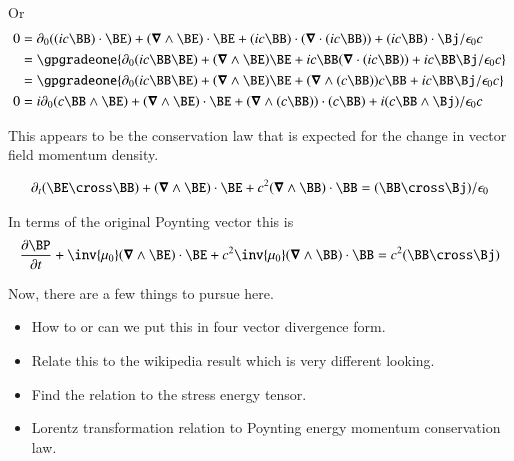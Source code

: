 Or
\begin{align*}
0
&= \partial_0 {((ic \BB) \cdot \BE)} +(\spacegrad \wedge \BE) \cdot \BE + (i c\BB) \cdot (\spacegrad \cdot (ic \BB)) + (i c\BB) \cdot \Bj/\epsilon_0 c \\
&= \gpgradeone{ \partial_0 (ic \BB \BE) +(\spacegrad \wedge \BE) \BE + i c\BB (\spacegrad \cdot (ic \BB)) + i c\BB \Bj/\epsilon_0 c } \\
&= \gpgradeone{ \partial_0 (ic \BB \BE) +(\spacegrad \wedge \BE) \BE + (\spacegrad \wedge (c \BB)) c \BB + i c\BB \Bj/\epsilon_0 c } \\
0 &= i\partial_0 (c \BB \wedge \BE) + (\spacegrad \wedge \BE) \cdot \BE + (\spacegrad \wedge (c \BB)) \cdot (c \BB) + i( c\BB \wedge \Bj)/\epsilon_0 c
\end{align*}

This appears to be the conservation law that is expected for the change in vector field momentum density.

\begin{align}\label{eqn:poynting_rate:momCons}
\partial_t (\BE \cross \BB) + (\spacegrad \wedge \BE) \cdot \BE + c^2 (\spacegrad \wedge \BB) \cdot \BB = (\BB \cross \Bj)/\epsilon_0
\end{align}

In terms of the original Poynting vector this is
\begin{align}\label{eqn:poynting_rate:withPoynting}
\PD{t}{\BP} + \inv{\mu_0}(\spacegrad \wedge \BE) \cdot \BE + c^2 \inv{\mu_0}(\spacegrad \wedge \BB) \cdot \BB = c^2 (\BB \cross \Bj)
\end{align}

%
%

Now, there are a few things to pursue here.

\begin{itemize}
\item How to or can we put this in four vector divergence form.
\item Relate this to the wikipedia result which is very different looking.
\item Find the relation to the stress energy tensor.
\item Lorentz transformation relation to Poynting energy momentum conservation law.
\end{itemize}

